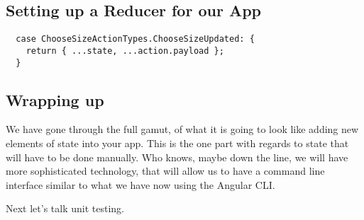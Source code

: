 \subsection{ Setting up a Reducer for our App }
\begin{lstlisting}
  case ChooseSizeActionTypes.ChooseSizeUpdated: {
    return { ...state, ...action.payload };
  }
\end{lstlisting}

\subsection{ Wrapping up }
We have gone through the full gamut, of what it is going to look like adding new
elements of state into your app. This is the one part with regards to state that
will have to be done manually. Who knows, maybe down the line, we will have more
sophisticated technology, that will allow us to have a command line interface
similar to what we have now using the Angular CLI.

Next let's talk unit testing.
